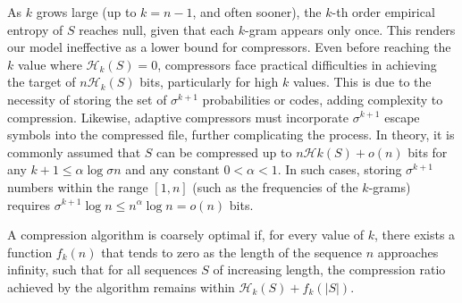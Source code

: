 \begin{remark}
    As $k$ grows large (up to $k=n-1$, and often sooner), the $k$-th order empirical entropy of $S$ reaches null, given that each $k$-gram appears only once. This renders our model ineffective as a lower bound for compressors. Even before reaching the $k$ value where $\mathcal{H}_k(S)=0$, compressors face practical difficulties in achieving the target of $n\mathcal{H}_k(S)$ bits, particularly for high $k$ values. This is due to the necessity of storing the set of $\sigma^{k+1}$ probabilities or codes, adding complexity to compression. Likewise, adaptive compressors must incorporate $\sigma^{k+1}$ escape symbols into the compressed file, further complicating the process. In theory, it is commonly assumed that $S$ can be compressed up to $n \mathcal{H}k(S) + o(n)$ bits for any $k+1 \leq \alpha \log\sigma n$ and any constant $0 < \alpha < 1$. In such cases, storing $\sigma^{k+1}$ numbers within the range $[1,n]$ (such as the frequencies of the $k$-grams) requires $\sigma^{k+1} \log n \leq n^\alpha \log n = o(n)$ bits. \cite{navarro2016compact}
\end{remark}

\begin{definition} \label{def:coarsely_optimal_compression_algorithm}
    A compression algorithm is coarsely optimal if, for every value of $k$, there exists a function $f_k(n)$ that tends to zero as the length of the sequence $n$ approaches infinity, such that for all sequences $S$ of increasing length, the compression ratio achieved by the algorithm remains within $\mathcal{H}_k(S) + f_k(|S|)$.
\end{definition}

